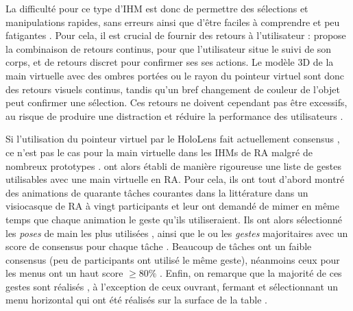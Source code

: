 La difficulté pour ce type d'IHM est donc de permettre des sélections et manipulations rapides, sans erreurs ainsi que d'être faciles à comprendre et peu fatigantes \citep{Argelaguet2013}. Pour cela, il est crucial de fournir des retours à l'utilisateur : \cite{Chan2010} propose la combinaison de retours continus, pour que l'utilisateur situe le suivi de son corps, et de retours discret pour confirmer ses ses actions. Le modèle 3D de la main virtuelle avec des ombres portées ou le rayon du pointeur virtuel sont donc des retours visuels continus, tandis qu'un bref changement de couleur de l'objet peut confirmer une sélection. Ces retours ne doivent cependant pas être excessifs, au risque de produire une distraction et réduire la performance des utilisateurs \citep{Argelaguet2013}.



Si l'utilisation du pointeur virtuel par le HoloLens fait actuellement consensus \citep{Kitoe2018}, ce n'est pas le cas pour la main virtuelle dans les IHMs de RA malgré de nombreux prototypes \citep{Piumsomboon2013}. \citeauthor{Piumsomboon2013} ont alors établi de manière rigoureuse une liste de gestes utilisables avec une main virtuelle en RA. Pour cela, ils ont tout d'abord montré des animations de quarante tâches courantes dans la littérature dans un visiocasque de RA à vingt participants et leur ont demandé de mimer en même temps que chaque animation le geste qu'ils utiliseraient. Ils ont alors sélectionné les \emph{poses} de main les plus utilisées , ainsi que le ou les \emph{gestes} majoritaires avec un score de consensus pour chaque tâche . Beaucoup de tâches ont un faible consensus (peu de participants ont utilisé le même geste), néanmoins ceux pour les menus ont un haut score $\geq 80\%$ . Enfin, on remarque que la majorité de ces gestes sont réalisés , à l'exception de ceux ouvrant, fermant et sélectionnant un menu horizontal qui ont été réalisés sur la surface de la table .

